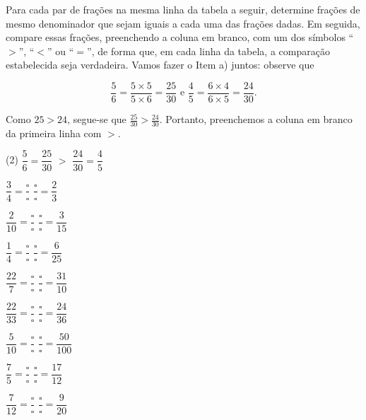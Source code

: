 \begin{atividade}{}\label{chap4-ativ13}

Para cada par de frações na mesma linha da tabela a seguir, determine frações de mesmo denominador que sejam iguais a cada uma das frações dadas. Em seguida, compare essas frações, preenchendo a coluna em branco, com um dos símbolos ``$>$'', ``$<$'' ou ``$=$'', de forma que, em cada linha da tabela, a comparação estabelecida seja verdadeira. Vamos fazer o Item a) juntos: observe que

$$\frac{5}{6} = \frac{5 \times 5}{5 \times 6} = \frac{25}{30} \text{ e } \frac{4}{5} = \frac{6 \times 4}{6 \times 5} = \frac{24}{30}.$$

Como $25 > 24$, segue-se que $\frac{25}{30} > \frac{24}{30}$. Portanto, preenchemos a coluna em branco da primeira linha com $>$.


\begin{tasks}(2)
\task \hspace{1ex}$\dfrac{5}{6} = \dfrac{25}{30}$ \quad $>$ \quad $\dfrac{24}{30} = \dfrac{4}{5}$

\task \hspace{1ex}$\dfrac{3}{4} = \dfrac{\square}{\square}$\quad {\Large $\square$} \quad$\dfrac{\square}{\square} = \dfrac{2}{3}$

\task $\dfrac{2}{10} = \dfrac{\square}{\square}$\quad {\Large $\square$} \quad$\dfrac{\square}{\square} = \dfrac{3}{15}$

\task \hspace{1ex}$\dfrac{1}{4} = \dfrac{\square}{\square}$\quad {\Large $\square$} \quad$\dfrac{\square}{\square} = \dfrac{6}{25}$

\task $\dfrac{22}{7} = \dfrac{\square}{\square}$\quad {\Large $\square$} \quad$\dfrac{\square}{\square} = \dfrac{31}{10}$

\task $\dfrac{22}{33} = \dfrac{\square}{\square}$\quad {\Large $\square$} \quad$\dfrac{\square}{\square} = \dfrac{24}{36}$

\task $\dfrac{5}{10} = \dfrac{\square}{\square}$\quad {\Large $\square$} \quad$\dfrac{\square}{\square} = \dfrac{50}{100}$

\task \hspace{1ex}$\dfrac{7}{5} = \dfrac{\square}{\square}$\quad {\Large $\square$} \quad$\dfrac{\square}{\square} = \dfrac{17}{12}$

\task $\dfrac{7}{12} = \dfrac{\square}{\square}$\quad {\Large $\square$} \quad$\dfrac{\square}{\square} = \dfrac{9}{20}$
\end{tasks}



\end{atividade}
